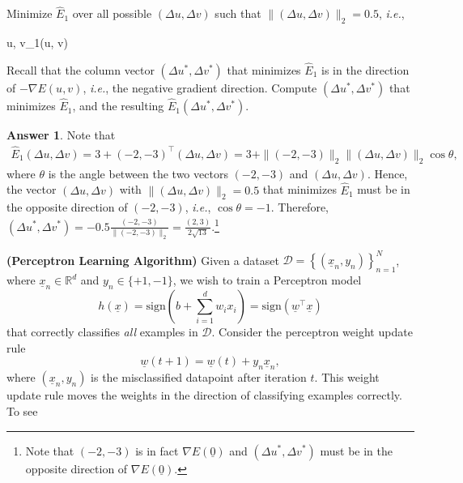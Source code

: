 \documentclass{article}
\newcommand{\setD}{\mathcal{D}}
\newcommand{\setRd}{\mathbb{R}^d}
\renewcommand{\vec}[1]{\underline{#1}}
\newcommand{\vecw}{\vec{w}}
\newcommand{\vecx}{\vec{x}}
\newcommand{\vecxn}{\vec{x}_n}
\newcommand{\setxnyn}{\left\{(\vecxn, y_n)\right\}_{n=1}^{N}}
\theoremstyle{definition}
\newtheorem*{answer}{Answer}
\begin{document}
\begin{question}[start=0]
\begin{question}
\begin{question}
			\item Minimize $\hat{E}_1$ over all possible $(\Delta u, \Delta v)$ such that $\|(\Delta u, \Delta v)\|_2 = 0.5$, \textit{i.e.},
			\begin{mini*}
				{\Delta u, \Delta v}{_1(\Delta u, \Delta v)}
				{}{}
				\addConstraint{\|(\Delta u, \Delta v)\|_2}{ = 0.5.}
			\end{mini*}
			Recall that the column vector $(\Delta u^* , \Delta v^* )$ that minimizes $\hat{E}_1$ is in the direction of $-\nabla E(u, v)$, \textit{i.e.}, the negative gradient direction. Compute $(\Delta u^* , \Delta v^* )$ that minimizes $\hat{E}_1$, and the resulting $\hat{E}_1(\Delta u^*, \Delta v^*)$.
			\begin{answer}
				Note that 
				\begin{align*}
					\hat{E}_1(\Delta u, \Delta v) = 3 + (-2, -3)^\top (\Delta u, \Delta v) = 3 + \|(-2, -3)\|_2 \|(\Delta u, \Delta v)\|_2 \cos{\theta}, 
				\end{align*}
				where $\theta$ is the angle between the two vectors $(-2, -3)$ and $(\Delta u, \Delta v)$. Hence, the vector $(\Delta u, \Delta v)$ with $\|(\Delta u, \Delta v)\|_2 = 0.5$ that minimizes $\hat{E}_1$ must be in the opposite direction of $(-2, -3)$, \emph{i.e.}, $\cos{\theta}=-1$. Therefore, $(\Delta u^*, \Delta v^*) = -0.5 \frac{(-2, -3)}{\|(-2, -3)\|_2} = \frac{(2, 3)}{2\sqrt{13}}$.\footnote{Note that $(-2, -3)$ is in fact $\nabla E(\underline{0})$ and $(\Delta u^*, \Delta v^*)$ must be in the opposite direction of $\nabla E(\underline{0})$.}
			\end{answer}
		\end{question}
	\end{question}
	\item \textbf{(Perceptron Learning Algorithm)}	Given a dataset $\setD=\setxnyn$, where $\vecxn \in \setRd$ and $y_n \in \{+1, -1\}$, we wish to train a Perceptron model
	\begin{equation*}
		h(\vecx) = \text{sign}\left(b + \sum_{i=1}^d w_i x_i \right) = \text{sign}(\vecw^\top \vecx)
	\end{equation*}
	that correctly classifies \textit{all} examples in $\setD$. Consider the perceptron weight update rule
	\begin{equation*}
		\vecw(t+1) = \vecw(t) + y_n\vecxn,
	\end{equation*}
	where $(\vecxn, y_n)$ is the misclassified datapoint after iteration $t$. This weight update rule moves the weights in the direction of classifying examples correctly. To see

\end{question}
\end{document}
